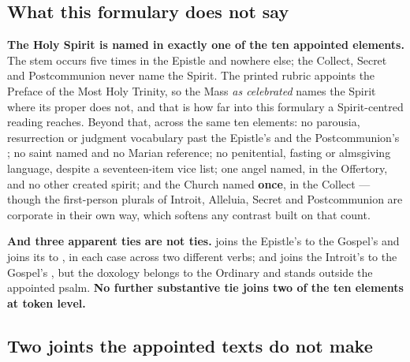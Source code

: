 \subsection*{What this formulary does not say}

\textbf{The Holy Spirit is named in exactly one of the ten appointed elements.}
The  stem occurs five times in the Epistle and nowhere else; the
Collect, Secret and Postcommunion never name the Spirit. The printed rubric
appoints the Preface of the Most Holy Trinity, so the Mass \emph{as celebrated}
names the Spirit where its proper does not, and that is how far into this
formulary a Spirit-centred reading reaches. Beyond that, across the same ten
elements: no parousia, resurrection or judgment vocabulary past the
Epistle's  and the Postcommunion's
; no saint named and no Marian reference; no
penitential, fasting or almsgiving language, despite a seventeen-item vice
list; one angel named, in the Offertory, and no other created spirit; and the
Church named \textbf{once}, in the Collect --- though the first-person plurals
of Introit, Alleluia, Secret and Postcommunion are corporate in their own way,
which softens any contrast built on that count.

\textbf{And three apparent ties are not ties.}  joins the Epistle's
 to the Gospel's  and  joins
its  to , in each case across two
different verbs; and  joins the Introit's  to
the Gospel's , but the doxology belongs to the
Ordinary and stands outside the appointed psalm. \textbf{No further substantive tie joins two of the ten
elements at token level.}

\subsection*{Two joints the appointed texts do not make}


